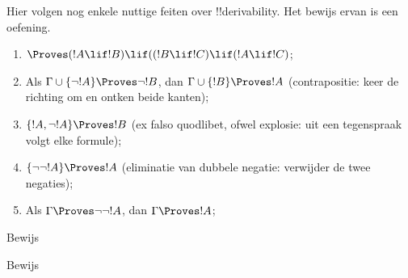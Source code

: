 \documentclass[openany]{memoir}
\begin{document}
Hier volgen nog enkele nuttige feiten over !!{derivability}. Het
bewijs ervan is een oefening.

\begin{prop}
\begin{enumerate}
\item $\Proves (!A \lif !B) \lif ((!B \lif !C)
  \lif (!A \lif !C)$; 
\item Als $\Gamma \cup \{ \lnot !A\}
  \Proves \lnot !B$, dan $\Gamma \cup \{ !B\} \Proves
  !A$ (contrapositie: keer de richting om en ontken beide kanten);
\item  $\{ !A, \lnot!A\} \Proves
    !B$ (ex falso quodlibet, ofwel explosie: uit een tegenspraak volgt
    elke formule); 
\item  $\{ \lnot\lnot!A\} \Proves
  !A$ (eliminatie van dubbele negatie: verwijder de twee negaties);
\item Als $\Gamma \Proves \lnot\lnot!A$, dan $\Gamma \Proves
  !A$;
\end{enumerate}
\end{prop}

\begin{prob}
  Bewijs 
\end{prob}
\tagendprob

\begin{prob}
  Bewijs 
\end{prob}
\tagendprob
\endgroup

\begingroup
\def\olfilename{OLP-0120}
\def\olfilepath{content/first-order-logic/axiomatic-deduction/}
\hypertarget{unit-OLP-0120}{}




\end{document}
